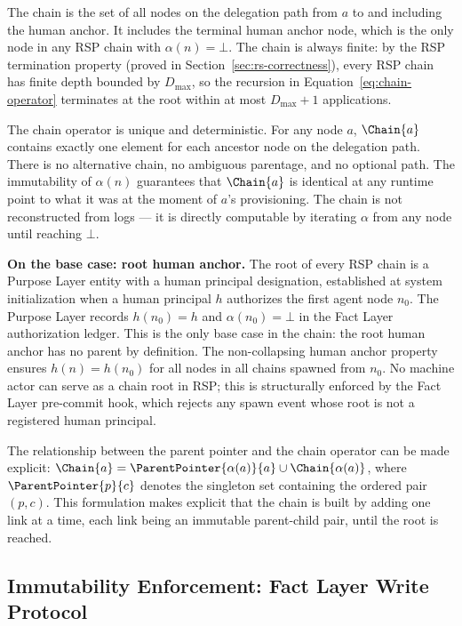 The chain is the set of all nodes on the delegation path from $a$ to and including the human anchor. It includes the terminal human anchor node, which is the only node in any RSP chain with $\alpha(n) = \bot$. The chain is always finite: by the RSP termination property (proved in Section~\ref{sec:rs-correctness}), every RSP chain has finite depth bounded by $D_{\max}$, so the recursion in Equation~\ref{eq:chain-operator} terminates at the root within at most $D_{\max} + 1$ applications.

The chain operator is unique and deterministic. For any node $a$, $\Chain{a}$ contains exactly one element for each ancestor node on the delegation path. There is no alternative chain, no ambiguous parentage, and no optional path. The immutability of $\alpha(n)$ guarantees that $\Chain{a}$ is identical at any runtime point to what it was at the moment of $a$'s provisioning. The chain is not reconstructed from logs --- it is directly computable by iterating $\alpha$ from any node until reaching $\bot$.

\begin{note}
\textbf{On the base case: root human anchor.}
The root of every RSP chain is a Purpose Layer entity with a human principal designation, established at system initialization when a human principal $h$ authorizes the first agent node $n_0$. The Purpose Layer records $h(n_0) = h$ and $\alpha(n_0) = \bot$ in the Fact Layer authorization ledger. This is the only base case in the chain: the root human anchor has no parent by definition. The non-collapsing human anchor property ensures $h(n) = h(n_0)$ for all nodes in all chains spawned from $n_0$. No machine actor can serve as a chain root in RSP; this is structurally enforced by the Fact Layer pre-commit hook, which rejects any spawn event whose root is not a registered human principal.
\end{note}

The relationship between the parent pointer and the chain operator can be made explicit: $\Chain{a} = \ParentPointer{\alpha(a)}{a} \cup \Chain{\alpha(a)}$, where $\ParentPointer{p}{c}$ denotes the singleton set containing the ordered pair $(p, c)$. This formulation makes explicit that the chain is built by adding one link at a time, each link being an immutable parent-child pair, until the root is reached.

\subsection{Immutability Enforcement: Fact Layer Write Protocol}
\label{sec:fact-layer-write-protocol}

